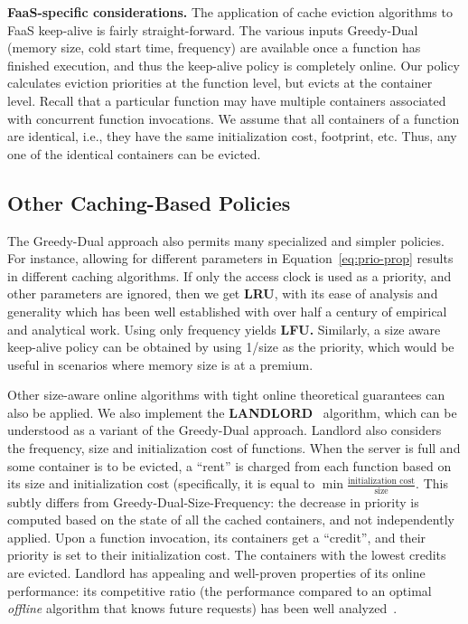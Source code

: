 \noindent \textbf{FaaS-specific considerations.}
The application of cache eviction algorithms to FaaS keep-alive is fairly straight-forward.
The various inputs Greedy-Dual (memory size, cold start time, frequency) are available once a function has finished execution, and thus the keep-alive policy is completely online. 
Our policy calculates eviction priorities at the function level, but evicts at the container level. 
Recall that a particular function may have multiple containers associated with concurrent function invocations. 
We assume that all containers of a function are identical, i.e., they have the same initialization cost, footprint, etc. 
Thus, any one of the identical containers can be evicted. 



\subsection{Other Caching-Based Policies}
\label{subsec:variants}
\vspace*{\subsecspace}

The Greedy-Dual approach also permits many specialized and simpler policies.
For instance, allowing for different parameters in Equation~\ref{eq:prio-prop} results in different caching algorithms.
If only the access clock is used as a priority, and other parameters are ignored, then we get \textbf{LRU}, with its ease of analysis and generality which has been well established with over half a century of empirical and analytical work. 
Using only frequency yields \textbf{LFU.}
Similarly, a size aware keep-alive policy can be obtained by using 1/size as the priority, which would be useful in scenarios where memory size is at a premium. 


Other size-aware online algorithms with tight online theoretical guarantees can also be applied.
We also implement the \textbf{LANDLORD}~\cite{young2002line} algorithm, which can be understood as a variant of the Greedy-Dual approach.
Landlord also considers the frequency, size and initialization cost of functions.
When the server is full and some container is to be evicted, a ``rent'' is charged from each function based on its size and initialization cost (specifically, it is equal to $\min \frac{\text{initialization cost}}{\text{size}}$.
This subtly differs from Greedy-Dual-Size-Frequency: the decrease in priority is computed based on the state of all the cached containers, and not independently applied. 
Upon a function invocation, its containers get a ``credit'', and their priority is set to their initialization cost. 
The containers with the lowest credits are evicted. 
Landlord has appealing and well-proven properties of its online performance: its competitive ratio (the performance compared to an optimal \emph{offline} algorithm that knows future requests) has been well analyzed~\cite{young2002line}. 




